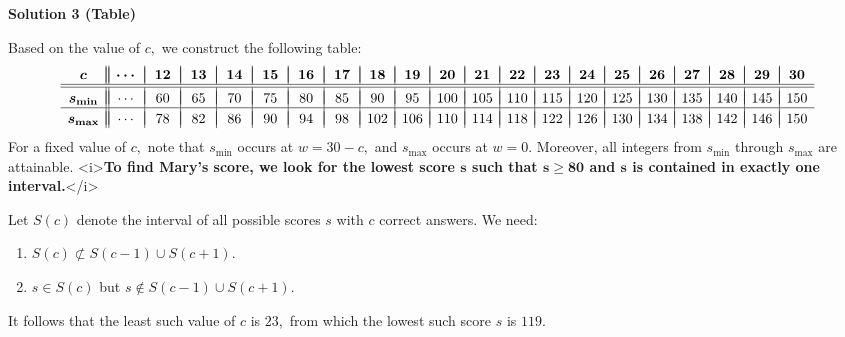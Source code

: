 \begin{enumerate}
\textbf{Solution 3 (Table)}

Based on the value of $c,$ we construct the following table:
 \[\begin{array}{c||c|c|c|c|c|c|c|c|c|c|c|c|c|c|c|c|c|c|c|c}    &\hspace{5.5mm}&\hspace{5.5mm}&\hspace{5.5mm}&\hspace{5.5mm}&\hspace{5.5mm}&\hspace{5.5mm}&\hspace{5.5mm}&&&&&&&&&&&&& \\ [-2.5ex] \boldsymbol{c} &\boldsymbol{\cdots}&\boldsymbol{12}&\boldsymbol{13}&\boldsymbol{14}&\boldsymbol{15}&\boldsymbol{16}&\boldsymbol{17}&\boldsymbol{18}&\boldsymbol{19}&\boldsymbol{20}&\boldsymbol{21}&\boldsymbol{22}&\boldsymbol{23}&\boldsymbol{24}&\boldsymbol{25}&\boldsymbol{26}&\boldsymbol{27}&\boldsymbol{28}&\boldsymbol{29}&\boldsymbol{30} \\  \hline \hline &&&&&&&&&&&&&&&&&&& \\ [-2.25ex] \boldsymbol{s_{\min}} &\cdots&60&65&70&75&80&85&90&95&100&105&110&115&120&125&130&135&140&145&150 \\ \hline   &&&&&&&&&&&&&&&&&&& \\ [-2.25ex] \boldsymbol{s_{\max}} &\cdots&78&82&86&90&94&98&102&106&110&114&118&122&126&130&134&138&142&146&150 \end{array}\]For a fixed value of $c,$ note that $s_{\min}$ occurs at $w=30-c,$ and $s_{\max}$ occurs at $w=0.$ Moreover, all integers from $s_{\min}$ through $s_{\max}$ are attainable. <i>\textbf{To find Mary's score, we look for the lowest score $\boldsymbol{s}$ such that $\boldsymbol{s\geq80}$ and $\boldsymbol{s}$ is contained in exactly one interval.}</i>

 Let $S(c)$ denote the interval of all possible scores $s$ with $c$ correct answers. We need: 

 
            \begin{enumerate} 
        \item $S(c)\not\subset S(c-1)\cup S(c+1).$

        \item $s\in S(c)$ but $s\not\in S(c-1)\cup S(c+1).$

            \end{enumerate}
            It follows that the least such value of $c$ is $23,$ from which the lowest such score $s$ is $\boxed{119}.$





\end{enumerate}
